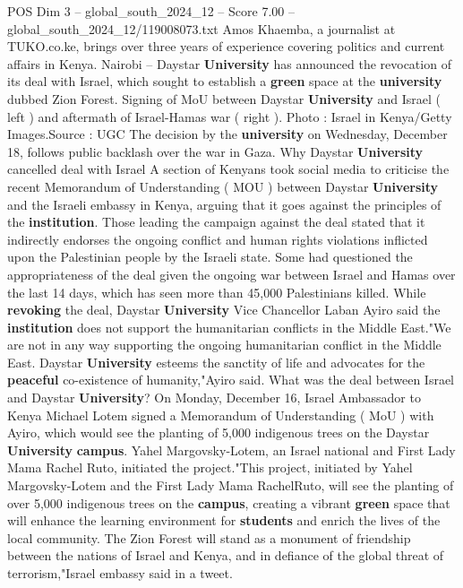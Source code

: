 \begin{textsample}{POS Dim 3 – global\_south\_2024\_12 – Score 7.00 – global\_south\_2024\_12/119008073.txt}  \label{ex:f3_pos_391}
Amos Khaemba, a journalist at TUKO.co.ke, brings over three years of experience covering politics and current affairs in Kenya.
Nairobi -- Daystar \textbf{University} has announced the revocation of its deal with Israel, which sought to establish a \textbf{green} space at the \textbf{university} dubbed Zion Forest.
Signing of MoU between Daystar \textbf{University} and Israel ( left ) and aftermath of Israel-Hamas war ( right ).
Photo : Israel in Kenya/Getty Images.Source : UGC The decision by the \textbf{university} on Wednesday, December 18, follows public backlash over the war in Gaza.
Why Daystar \textbf{University} cancelled deal with Israel A section of Kenyans took social media to criticise the recent Memorandum of Understanding ( MOU ) between Daystar \textbf{University} and the Israeli embassy in Kenya, arguing that it goes against the principles of the \textbf{institution}.
Those leading the campaign against the deal stated that it indirectly endorses the ongoing conflict and human rights violations inflicted upon the Palestinian people by the Israeli state.
Some had questioned the appropriateness of the deal given the ongoing war between Israel and Hamas over the last 14 days, which has seen more than 45,000 Palestinians killed.
While \textbf{revoking} the deal, Daystar \textbf{University} Vice Chancellor Laban Ayiro said the \textbf{institution} does not support the humanitarian conflicts in the Middle East."We are not in any way supporting the ongoing humanitarian conflict in the Middle East.
Daystar \textbf{University} esteems the sanctity of life and advocates for the \textbf{peaceful} co-existence of humanity,"Ayiro said.
What was the deal between Israel and Daystar \textbf{University}?
On Monday, December 16, Israel Ambassador to Kenya Michael Lotem signed a Memorandum of Understanding ( MoU ) with Ayiro, which would see the planting of 5,000 indigenous trees on the Daystar \textbf{University} \textbf{campus}.
Yahel Margovsky-Lotem, an Israel national and First Lady Mama Rachel Ruto, initiated the project."This project, initiated by Yahel Margovsky-Lotem and the First Lady Mama RachelRuto, will see the planting of over 5,000 indigenous trees on the \textbf{campus}, creating a vibrant \textbf{green} space that will enhance the learning environment for \textbf{students} and enrich the lives of the local community.
The Zion Forest will stand as a monument of friendship between the nations of Israel and Kenya, and in defiance of the global threat of terrorism,"Israel embassy said in a tweet.

\end{textsample}
